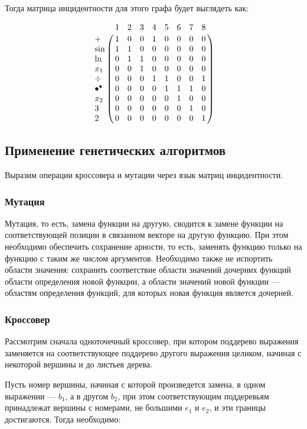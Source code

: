 \documentclass[12pt,a4paper]{amsart}
\begin{document}
Тогда матрица инцидентности для этого графа будет выглядеть как:

$$
\bordermatrix{
~ 	 			  & 1 & 2 & 3 & 4 & 5 & 6 & 7 & 8 \cr
+			      & 1 & 0 & 0 & 1 & 0 & 0 & 0 & 0 \cr
\sin 			  & 1 & 1 & 0 & 0 & 0 & 0 & 0 & 0 \cr
\ln				  & 0 & 1 & 1 & 0 & 0 & 0 & 0 & 0 \cr
x_1				  & 0 & 0 & 1 & 0 & 0 & 0 & 0 & 0 \cr
\div 			  & 0 & 0 & 0 & 1 & 1 & 0 & 0 & 1 \cr
\bullet^{\bullet} & 0 & 0 & 0 & 0 & 1 & 1 & 1 & 0 \cr
x_2				  & 0 & 0 & 0 & 0 & 0 & 1 & 0 & 0 \cr
3				  & 0 & 0 & 0 & 0 & 0 & 0 & 1 & 0 \cr
2				  & 0 & 0 & 0 & 0 & 0 & 0 & 0 & 1
}
$$


\subsection{Применение генетических алгоритмов}

Выразим операции кроссовера и мутации через язык матриц инцидентности.

\subsubsection{Мутация}

Мутация, то есть, замена функции на другую, сводится к замене функции на соответствующей позиции в связанном векторе
на другую функцию. При этом необходимо обеспечить сохранение арности, то есть, заменять функцию только на функцию с
таким же числом аргументов. Необходимо также не испортить области значения: сохранить соответствие области значений
дочерних функций области определения новой функции, а области значений новой функции --- областям определения функций,
для которых новая функция является дочерней.

\subsubsection{Кроссовер}

Рассмотрим сначала одноточечный кроссовер, при котором поддерево выражения заменяется на соответствующее поддерево
другого выражения целиком, начиная с некоторой вершины и до листьев дерева.

Пусть номер вершины, начиная с которой произведется замена, в одном выражении --- $b_1$, а в другом $b_2$, при этом
соответствующим поддеревьям принадлежат вершины с номерами, не большими $e_1$ и $e_2$, и эти границы достигаются.
Тогда необходимо:
\end{document}

